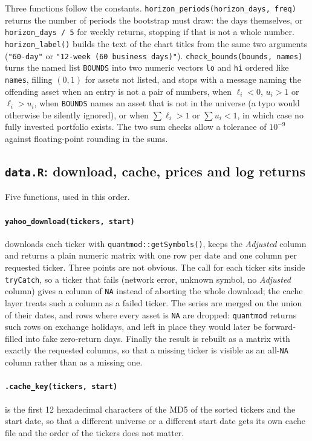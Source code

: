 \documentclass[11pt,a4paper]{article}
\newcommand{\code}[1]{\texttt{#1}}
\newcommand{\file}[1]{\texttt{#1}}
\theoremstyle{plain}
\theoremstyle{remark}
\begin{document}
Three functions follow the constants. \code{horizon\_periods(horizon\_days,
freq)} returns the number of periods the bootstrap must draw: the days
themselves, or \code{horizon\_days / 5} for weekly returns, stopping if that
is not a whole number. \code{horizon\_label()} builds the text of the chart
titles from the same two arguments (\code{"60-day"} or
\code{"12-week (60 business days)"}). \code{check\_bounds(bounds, names)}
turns the named list \code{BOUNDS} into two numeric vectors \code{lo} and
\code{hi} ordered like \code{names}, filling $(0,1)$ for assets not listed,
and stops with a message naming the offending asset when an entry is not a
pair of numbers, when $\ell_i < 0$, $u_i > 1$ or $\ell_i > u_i$, when
\code{BOUNDS} names an asset that is not in the universe (a typo would
otherwise be silently ignored), or when $\sum\ell_i > 1$ or $\sum u_i < 1$,
in which case no fully invested portfolio exists. The two sum checks allow a
tolerance of $10^{-9}$ against floating-point rounding in the sums.

\subsection{\file{data.R}: download, cache, prices and log returns}
\label{sec:code-data}

Five functions, used in this order.

\paragraph{\code{yahoo\_download(tickers, start)}} downloads each ticker
with \code{quantmod::getSymbols()}, keeps the \emph{Adjusted} column and
returns a plain numeric matrix with one row per date and one column per
requested ticker. Three points are not obvious. The call for each ticker
sits inside \code{tryCatch}, so a ticker that fails (network error,
unknown symbol, no \emph{Adjusted} column) gives a column of \code{NA}
instead of aborting the whole download; the cache layer treats such a
column as a failed ticker. The series are merged on the union of their
dates, and rows where every asset is \code{NA} are dropped: \code{quantmod}
returns such rows on exchange holidays, and left in place they would later
be forward-filled into fake zero-return days. Finally the result is
rebuilt as a matrix with exactly the requested columns, so that a missing
ticker is visible as an all-\code{NA} column rather than as a missing one.

\paragraph{\code{.cache\_key(tickers, start)}} is the first 12 hexadecimal
characters of the MD5 of the sorted tickers and the start date, so that a
different universe or a different start date gets its own cache file and
the order of the tickers does not matter.
\end{document}
